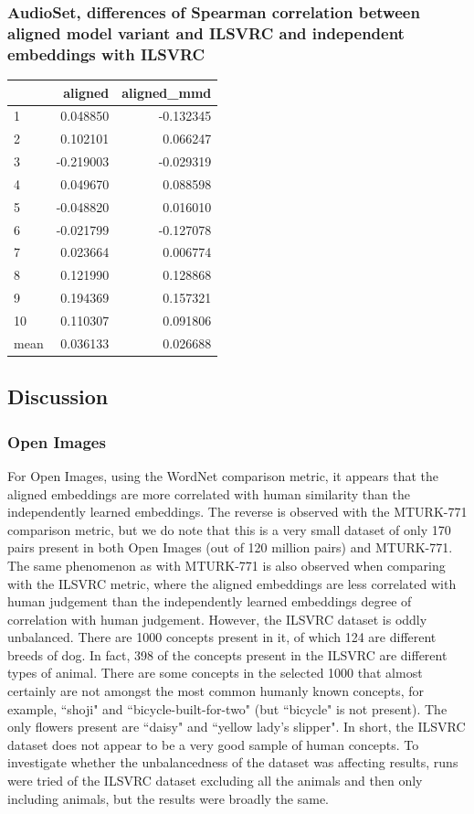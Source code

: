 \subsubsection{AudioSet, differences of Spearman correlation between aligned model variant and ILSVRC and independent embeddings with ILSVRC}


\begin{tabular}{lrr}
\toprule
{} &   aligned &  aligned\_mmd \\
\midrule
1    &  0.048850 &    -0.132345 \\
2    &  0.102101 &     0.066247 \\
3    & -0.219003 &    -0.029319 \\
4    &  0.049670 &     0.088598 \\
5    & -0.048820 &     0.016010 \\
6    & -0.021799 &    -0.127078 \\
7    &  0.023664 &     0.006774 \\
8    &  0.121990 &     0.128868 \\
9    &  0.194369 &     0.157321 \\
10   &  0.110307 &     0.091806 \\
\midrule
mean &  0.036133 &     0.026688 \\
\bottomrule
\end{tabular}


\subsection{Discussion}

\subsubsection{Open Images}

For Open Images, using the WordNet comparison metric, it appears that the aligned embeddings are more correlated with human similarity than the independently learned embeddings. The reverse is observed with the MTURK-771 comparison metric, but we do note that this is a very small dataset of only 170 pairs present in both Open Images (out of 120 million pairs) and MTURK-771. The same phenomenon as with MTURK-771 is also observed when comparing with the ILSVRC metric, where the aligned embeddings are less correlated with human judgement than the independently learned embeddings degree of correlation with human judgement. However, the ILSVRC dataset is oddly unbalanced. There are 1000 concepts present in it, of which 124 are different breeds of dog. In fact, 398 of the concepts present in the ILSVRC are different types of animal. There are some concepts in the selected 1000 that almost certainly are not amongst the most common humanly known concepts, for example, ``shoji" and ``bicycle-built-for-two" (but ``bicycle" is not present). The only flowers present are ``daisy" and ``yellow lady's slipper". In short, the ILSVRC dataset does not appear to be a very good sample of human concepts. To investigate whether the unbalancedness of the dataset was affecting results, runs were tried of the ILSVRC dataset excluding all the animals and then only including animals, but the results were broadly the same. 


